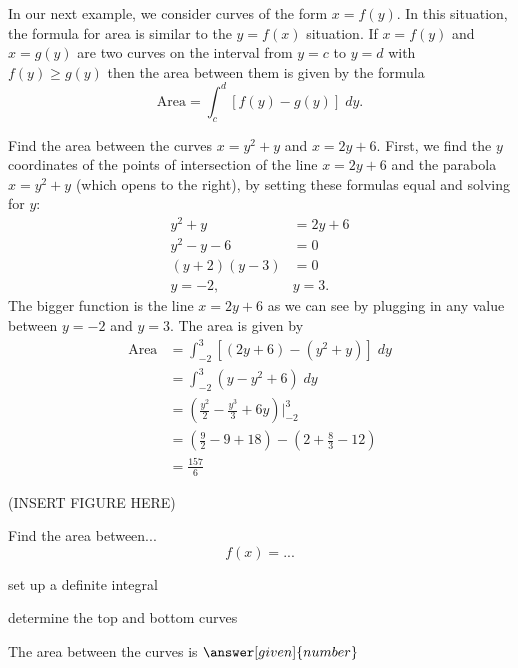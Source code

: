 \documentclass{ximera}
\begin{document}
In our next example, we consider curves of the form $x = f(y)$. In this situation, the formula for area is similar to the $y = f(x)$ situation.
If $x = f(y)$ and $x=g(y)$ are two curves on the interval from $y = c$ to $y = d$ with $f(y) \geq g(y)$
then the area between them is given by the formula
\[
\text{Area} = \int_c^d [f(y) - g(y)] \; dy.
\]
\begin{example}
Find the area between the curves $x = y^2 + y$ and $x = 2y + 6$.
First, we find the $y$ coordinates of the points of intersection of the line $x = 2y+6$ 
and the parabola $x=y^2 + y$ (which opens to the right), by setting these formulas equal and solving for $y$:
\begin{align*}
y^2 + y &= 2y + 6 \\
y^2 - y - 6 &= 0 \\
(y+2)(y-3) &= 0 \\
y = -2, & y = 3.
\end{align*}
The bigger function is the line $x = 2y+6$ as we can see by plugging in any value between $y = -2$ and $y=3$.
The area is given by
\begin{align*}
\text{Area} &= \int_{-2}^3 \left[(2y+6) - (y^2+y) \right] \; dy \\
            &= \int_{-2}^3 \left(y - y^2 + 6\right) \; dy \\
            &= \left(\frac{y^2}{2} - \frac{y^3}{3} + 6y \right) \bigg|_{-2}^{3} \\
            &= \left(\tfrac92 - 9 + 18\right) - \left(2 + \tfrac83 - 12\right)\\
            &= \tfrac{157}{6}         
\end{align*}

(INSERT FIGURE HERE)


\end{example}



\begin{center}
\begin{foldable}
\end{foldable}
\end{center}

\begin{problem} %
  Find the area between...
  \[
  f(x) =  ...
  \]
    \begin{hint}
      set up a definite integral
    \end{hint}
    \begin{hint}
      determine the top and bottom curves
    \end{hint}
    
		
		The area between the curves is
		 $\answer[given]{number}$
\end{problem}







\begin{center}
\begin{foldable}
\end{foldable}
\end{center}
\end{document}
